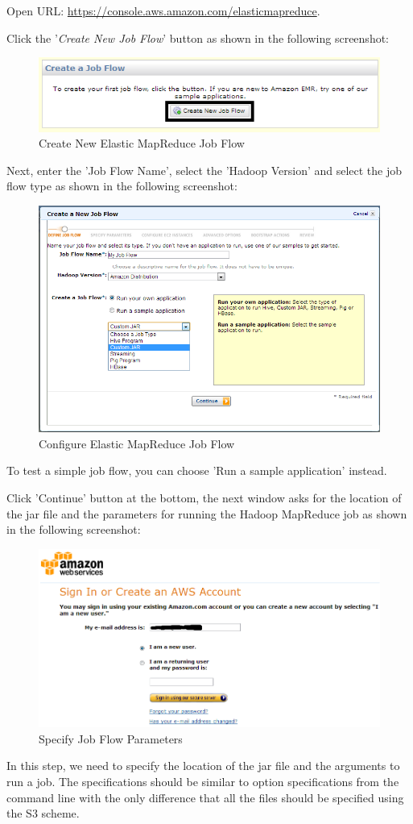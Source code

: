 Open URL: \url{https://console.aws.amazon.com/elasticmapreduce}.

Click the '\emph{Create New Job Flow}' button as shown in the following screenshot:
\begin{figure}[ht]
  \centering
  \includegraphics[width=.7\textwidth]{figs/5163os_08_23.png}
  \caption{Create New Elastic MapReduce Job Flow}\label{fig:aws.elasticmapred.createflow}
\end{figure} 
Next, enter the 'Job Flow Name', select the 'Hadoop Version' and select the job flow type as shown in the following screenshot:
\begin{figure}[ht]
  \centering
  \includegraphics[width=.8\textwidth]{figs/5163os_08_24.png}
  \caption{Configure Elastic MapReduce Job Flow}\label{fig:aws.elasticmapred.config}
\end{figure} 
To test a simple job flow, you can choose 'Run a sample application' instead.

Click 'Continue' button at the bottom, the next window asks for the location of the jar file and the parameters for running the Hadoop MapReduce job as shown in the following screenshot:
\begin{figure}[ht]
  \centering
  \includegraphics[width=.8\textwidth]{figs/5163os_08_01.png}
  \caption{Specify Job Flow Parameters}\label{fig:aws.elasticmapred.specify.param}
\end{figure} 
In this step, we need to specify the location of the jar file and the arguments to run a job. The specifications should be similar to option specifications from the command line with the only difference that all the files should be specified using the S3 scheme.

